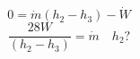 

\item[(b)] 
    \begin{equation*}
        0 = \dot{m} (h_2 - h_3) - \dot{W}
    \end{equation*}
    \begin{equation*}
        \frac{28W}{(h_2 - h_3)} = \dot{m} \quad h_2 ?
    \end{equation*}